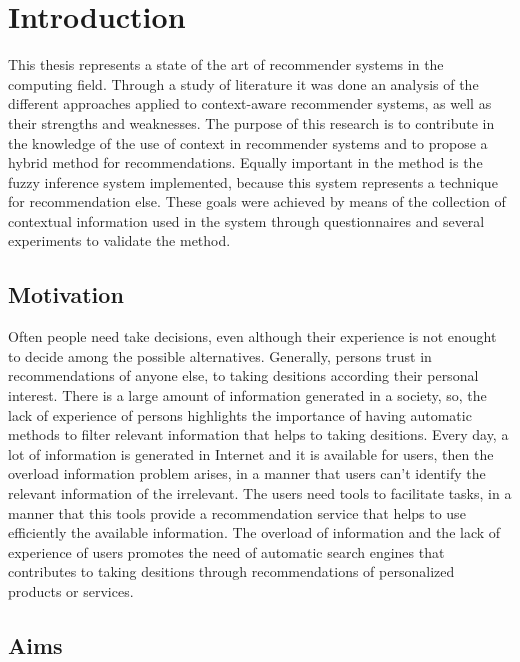 \chapter{Introduction} \label{introduction} 

This thesis represents a state of the art of recommender systems in
the computing field. Through a study of literature it was done an
analysis of the different approaches applied to context-aware
recommender systems, as well as their strengths and weaknesses. The
purpose of this research is to contribute in the knowledge of the use of
context in recommender systems and to propose a hybrid method for
recommendations. Equally important in the method is the fuzzy
inference system implemented, because this system represents a
technique for recommendation else. These goals were achieved by means
of the collection of contextual information used in the system
through questionnaires and several experiments to validate the
method.

\section{Motivation}

Often people need take decisions, even although their experience is
not enought to decide among the possible alternatives. Generally,
persons trust in recommendations of anyone else, to taking desitions
according their personal interest. There is a large amount of
information generated in a society, so, the lack of experience of
persons highlights the importance of having automatic methods to
filter relevant information that helps to taking desitions. Every day,
a lot of information is generated in Internet and it is available for
users, then the overload information problem arises, in a manner that
users can't identify the relevant information of the irrelevant. The
users need tools to facilitate tasks, in a manner that this tools
provide a recommendation service that helps to use efficiently the
available information. The overload of information and the lack of
experience of users promotes the need of automatic search engines 
that contributes to taking desitions through recommendations of
personalized products or services.

\section{Aims}


